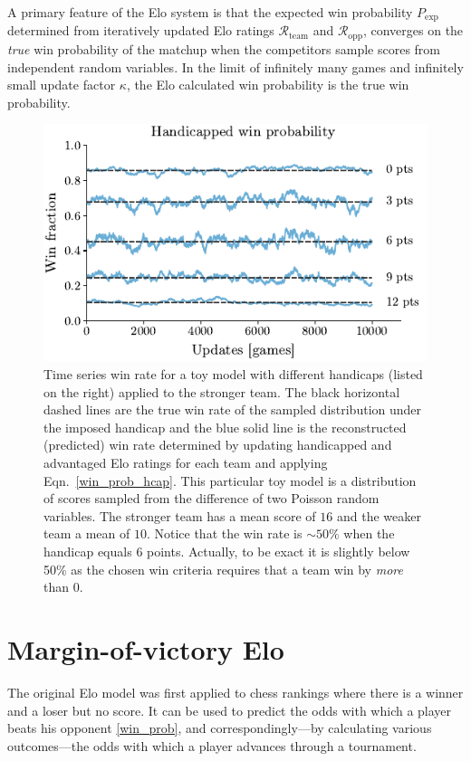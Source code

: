 \documentclass[aps,prc,reprint,amsmath,superscriptaddress]{revtex4-1}
\newcommand{\R}{\mathcal{R}}
\begin{document}
A primary feature of the Elo system is that the expected win probability $P_\text{exp}$ determined from iteratively updated Elo ratings $\R_\text{team}$ and $\R_\text{opp}$, converges on the \emph{true} win probability of the matchup when the competitors sample scores from independent random variables.
In the limit of infinitely many games and infinitely small update factor $\kappa$, the Elo calculated win probability is the true win probability.
\begin{figure}
  \includegraphics{win_rate}
  \caption{Time series win rate for a toy model with different handicaps (listed on the right) applied to the stronger team. The black horizontal dashed lines are the true win rate of the sampled distribution under the imposed handicap and the blue solid line is the reconstructed (predicted) win rate determined by updating handicapped and advantaged Elo ratings for each team and applying Eqn.~\eqref{win_prob_hcap}. This particular toy model is a distribution of scores sampled from the difference of two Poisson random variables. The stronger team has a mean score of $16$ and the weaker team a mean of $10$. Notice that the win rate is $\sim\!50\%$ when the handicap equals $6$ points. Actually, to be exact it is slightly below 50\% as the chosen win criteria requires that a team win by \emph{more} than 0.}
\end{figure}

\section{Margin-of-victory Elo}

The original Elo model was first applied to chess rankings where there is a winner and a loser but no score.
It can be used to predict the odds with which a player beats his opponent \eqref{win_prob}, and correspondingly---by calculating various outcomes---the odds with which a player advances through a tournament. 
\end{document}
